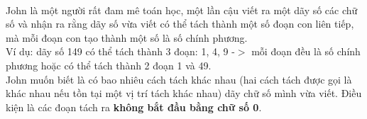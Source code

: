  

John là một người rất đam mê toán học, một lần cậu viết ra một dãy số các chữ số và nhận ra rằng dãy số vừa viết có thể tách thành một số đoạn con liên tiếp, mà mỗi đoạn con tạo thành một số là số chính phương.
\\Ví dụ: dãy số 149 có thể tách thành 3 đoạn: 1, 4, 9 -$>$ mỗi đoạn đều là số chính phương hoặc có thể tách thành 2 đoạn 1 và 49.
\\John muốn biết là có bao nhiêu cách tách khác nhau (hai cách tách được gọi là khác nhau nếu tồn tại một vị trí tách khác nhau) dãy chữ số mình vừa viết. Điều kiện là các đoạn tách ra \textbf{không bắt đầu bằng chữ số 0}.